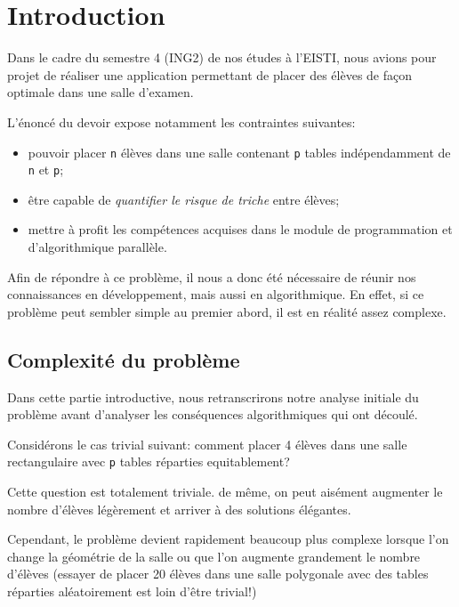 \documentclass[11pt,a4paper, openany]{book}
\begin{document}
\pagebreak
\newpage


\newpage
\tableofcontents
\thispagestyle{empty}
\newpage

\chapter*{Introduction}

Dans le cadre du semestre 4 (ING2) de nos études à l'EISTI, nous avions pour projet de réaliser une application permettant de placer des élèves de façon optimale dans une salle d'examen.

L'énoncé du devoir expose notamment les contraintes suivantes:

\begin{itemize}
\item pouvoir placer \texttt{n} élèves dans une salle contenant \texttt{p} tables indépendamment de \texttt{n} et \texttt{p};
\item être capable de \textit{quantifier le risque de triche} entre élèves;
\item mettre à profit les compétences acquises dans le module de programmation et d'algorithmique parallèle.
\end{itemize}

Afin de répondre à ce problème, il nous a donc été nécessaire de réunir nos connaissances en développement, mais aussi en algorithmique. En effet, si ce problème peut sembler simple au premier abord, il est en réalité assez complexe.

\section*{Complexité du problème}

Dans cette partie introductive, nous retranscrirons notre analyse initiale du problème avant d'analyser les conséquences algorithmiques qui ont découlé.

Considérons le cas trivial suivant: comment placer 4 élèves dans une salle rectangulaire avec \texttt{p} tables réparties equitablement?

Cette question est totalement triviale. de même, on peut aisément augmenter le nombre d'élèves légèrement et arriver à des solutions élégantes.

Cependant, le problème devient rapidement beaucoup plus complexe lorsque l'on change la géométrie de la salle ou que l'on augmente grandement le nombre d'élèves (essayer de placer 20 élèves dans une salle polygonale avec des tables réparties aléatoirement est loin d'être trivial!)
\end{document}
